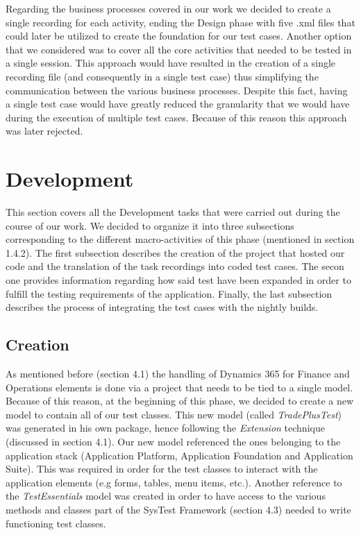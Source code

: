 Regarding the business processes covered in our work we decided to create a single recording for each activity, ending the Design phase with five .xml files that could later be utilized to create the foundation for our test cases. Another option that we considered was to cover all the core activities that needed to be tested in a single session. This approach would have resulted in the creation of a single recording file (and consequently in a single test case) thus simplifying the communication between the various business processes. Despite this fact, having a single test case would have greatly reduced the granularity that we would have during the execution of multiple test cases. Because of this reason this approach was later rejected.


\section{Development} 

This section covers all the Development tasks that were carried out during the course of our work. We decided to organize it into three subsections corresponding to the different macro-activities of this phase (mentioned in section 1.4.2). The first subsection describes the creation of the project that hosted our code and the translation of the task recordings into coded test cases. The secon one provides information regarding how said test have been expanded in order to fulfill the testing requirements of the application. Finally, the last subsection describes the process of integrating the test cases with the nightly builds.

\subsection{Creation}

As mentioned before (section 4.1) the handling of Dynamics 365 for Finance and Operations elements is done via a project that needs to be tied to a single model. Because of this reason, at the beginning of this phase, we decided to create a new model to contain all of our test classes. This new model (called \textit{TradePlusTest}) was generated in his own package, hence following the \textit{Extension} technique (discussed in section 4.1). Our new model referenced the ones belonging to the application stack (Application Platform, Application Foundation and Application Suite). This was required in order for the test classes to interact with the application elements (e.g forms, tables, menu items, etc.). Another reference to the \textit{TestEssentials} model was created in order to have access to the various methods and classes part of the SysTest Framework (section 4.3) needed to write functioning test classes.

